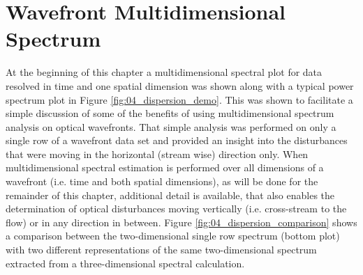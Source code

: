 \section{Wavefront Multidimensional Spectrum}
At the beginning of this chapter a multidimensional spectral plot for data resolved in time and one spatial dimension was shown along with a typical power spectrum plot in Figure \ref{fig:04_dispersion_demo}.
This was shown to facilitate a simple discussion of some of the benefits of using multidimensional spectrum analysis on optical wavefronts.
That simple analysis was performed on only a single row of a wavefront data set and provided an insight into the disturbances that were moving in the horizontal (stream wise) direction only.
When multidimensional spectral estimation is performed over all dimensions of a wavefront (i.e. time and both spatial dimensions), as will be done for the remainder of this chapter, additional detail is available, that also enables the determination of optical disturbances moving vertically (i.e. cross-stream to the flow) or in any direction in between.
Figure \ref{fig:04_dispersion_comparison} shows a comparison between the two-dimensional single row spectrum (bottom plot) with two different representations of the same two-dimensional spectrum extracted from a three-dimensional spectral calculation.

